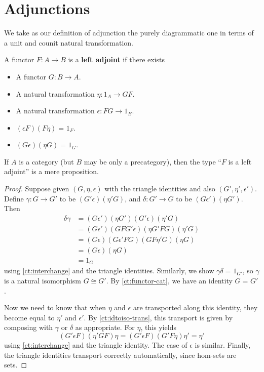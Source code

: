 \documentclass{amsart}
\newcommand{\id}[3][]{\ensuremath{#2 =_{#1} #3}\xspace}
\theoremstyle{definition}
\theoremstyle{remark}
\numberwithin{equation}{section}
\begin{document}
\section{Adjunctions}
\label{sec:adjunctions}

We take as our definition of adjunction the purely diagrammatic one in terms of a unit and counit natural transformation.

\begin{defn}\label{def:adjoint}
  A functor $F:A\to B$ is a \textbf{left adjoint} if there exists
  \begin{itemize}
  \item A functor $G:B\to A$.
  \item A natural transformation $\eta:1_A \to GF$.
  \item A natural transformation $\epsilon:FG\to 1_B$.
  \item $\id{(\epsilon F)(F\eta)}{1_F}$.
  \item $\id{(G\epsilon)(\eta G)}{1_G}$.
  \end{itemize}
\end{defn}

\begin{lem}\label{ct:adjprop}
  If $A$ is a category (but $B$ may be only a precategory), then the type ``$F$ is a left adjoint'' is a mere proposition.
\end{lem}
\begin{proof}
  Suppose given $(G,\eta,\epsilon)$ with the triangle identities and also $(G',\eta',\epsilon')$.
  Define $\gamma:G\to G'$ to be $(G'\epsilon)(\eta' G)$, and $\delta:G'\to G$ to be $(G\epsilon')(\eta G')$.
  Then
  \begin{align*}
    \delta\gamma &=
    (G\epsilon')(\eta G')(G'\epsilon)(\eta'G)\\
    &= (G\epsilon')(G F G'\epsilon)(\eta G' F G)(\eta'G)\\
    &= (G\epsilon)(G\epsilon'FG)(G F \eta' G)(\eta G)\\
    &= (G\epsilon)(\eta G)\\
    &= 1_G
  \end{align*}
  using \autoref{ct:interchange} and the triangle identities.
  Similarly, we show $\id{\gamma\delta}{1_{G'}}$, so $\gamma$ is a natural isomorphism $G\cong G'$.
  By \autoref{ct:functor-cat}, we have an identity $\id G {G'}$.

  Now we need to know that when $\eta$ and $\epsilon$ are transported along this identity, they become equal to $\eta'$ and $\epsilon'$.
  By \autoref{ct:idtoiso-trans}, this transport is given by composing with $\gamma$ or $\delta$ as appropriate.
  For $\eta$, this yields
  \begin{equation*}
    (G'\epsilon F)(\eta'GF)\eta
    = (G'\epsilon F)(G'F\eta)\eta'
    = \eta'
  \end{equation*}
  using \autoref{ct:interchange} and the triangle identity.
  The case of $\epsilon$ is similar.
  Finally, the triangle identities transport correctly automatically, since hom-sets are sets.
\end{proof}
\end{document}
